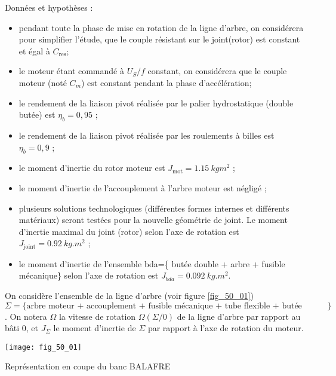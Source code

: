 Données et hypothèses :
\begin{itemize}
\item pendant toute la phase de mise en rotation de la ligne d’arbre, on considérera pour
simplifier l’étude, que le couple résistant sur le joint(rotor) est constant et égal à
$C_{\text{res}}$;
\item le moteur étant commandé à $U_S/f$ constant, on considérera que le couple moteur
(noté $C_m$) est constant pendant la phase d’accélération;
\item le rendement de la liaison pivot réalisée par le palier hydrostatique (double butée)
est $\eta_b = 0,95$ ;
\item le rendement de la liaison pivot réalisée par les roulements à billes est $\eta_b = 0,9$ ;
\item le moment d’inertie du rotor moteur est $J_{\text{mot}} = \SI{1,15}{kgm^2}$ ;
\item le moment d’inertie de l’accouplement à l’arbre moteur est négligé ;
\item plusieurs solutions technologiques (différentes formes internes et différents matériaux)
seront testées pour la nouvelle géométrie de joint. Le moment d’inertie
maximal du joint (rotor) selon l’axe de rotation est $J_{\text{joint}}= \SI{0,92}{kg. m^2}$ ;
\item le moment d’inertie de l’ensemble bda=\{ butée double + arbre + fusible mécanique\} selon l’axe de rotation est $J_{bda} = \SI{0,092}{kg.m^2}$.
\end{itemize}

On considère l’ensemble de la ligne d’arbre (voir figure \autoref{fig_50_01})  $\Sigma=\{ \text{arbre moteur + accouplement
+ fusible mécanique + tube flexible + butée double + Joint (rotor)} \}$.
On notera $\Omega$ la vitesse de rotation $\Omega\left(\Sigma/0\right)$ de la ligne d’arbre par rapport au bâti 0, et
$J_{\Sigma}$  le moment d’inertie de $\Sigma$ par rapport à l’axe de rotation du moteur.

 
\begin{marginfigure}
\texttt{[image: fig\_50\_01]}
\caption{Représentation en coupe du banc BALAFRE \label{fig_50_01}}
\end{marginfigure}


\fi
 
\ifprof
\else
\fi

\ifprof
\else
\fi

